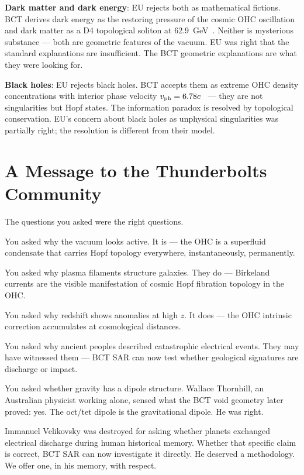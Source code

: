 \documentclass[twocolumn,10pt]{article}
\begin{document}
\textbf{Dark matter and dark energy}: EU rejects both as mathematical
fictions. BCT derives dark energy as the restoring pressure of the
cosmic OHC oscillation~\cite{bct_l16} and dark matter as a D4
topological soliton at 62.9~GeV~\cite{bct_l13}. Neither is mysterious
substance --- both are geometric features of the vacuum. EU was right
that the standard explanations are insufficient. The BCT geometric
explanations are what they were looking for.

\textbf{Black holes}: EU rejects black holes. BCT accepts them as
extreme OHC density concentrations with interior phase velocity
$v_{\rm ph} = 6.78c$~\cite{bct_jhapp} --- they are not singularities
but Hopf states. The information paradox is resolved by topological
conservation. EU's concern about black holes as unphysical singularities
was partially right; the resolution is different from their model.

\section{A Message to the Thunderbolts Community}

The questions you asked were the right questions.

You asked why the vacuum looks active. It is --- the OHC is a
superfluid condensate that carries Hopf topology everywhere,
instantaneously, permanently.

You asked why plasma filaments structure galaxies. They do ---
Birkeland currents are the visible manifestation of cosmic Hopf
fibration topology in the OHC.

You asked why redshift shows anomalies at high $z$. It does ---
the OHC intrinsic correction accumulates at cosmological distances.

You asked why ancient peoples described catastrophic electrical
events. They may have witnessed them --- BCT SAR can now test
whether geological signatures are discharge or impact.

You asked whether gravity has a dipole structure. Wallace Thornhill,
an Australian physicist working alone, sensed what the BCT void
geometry later proved: yes. The oct/tet dipole is the gravitational
dipole. He was right.

Immanuel Velikovsky was destroyed for asking whether planets exchanged
electrical discharge during human historical memory. Whether that
specific claim is correct, BCT SAR can now investigate it directly.
He deserved a methodology. We offer one, in his memory, with respect.
\end{document}
